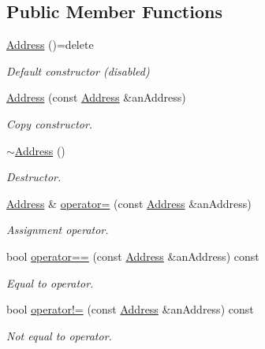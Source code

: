 \subsection*{Public Member Functions}
\begin{DoxyCompactItemize}
\item 
\hyperlink{classlibrary_1_1io_1_1ip_1_1_address_ab968d468b8bc2ba8f48fd2b6784832fe}{Address} ()=delete
\begin{DoxyCompactList}\small\item\em Default constructor (disabled) \end{DoxyCompactList}\item 
\hyperlink{classlibrary_1_1io_1_1ip_1_1_address_a222cb11723f00e1949560cd6cb6586d0}{Address} (const \hyperlink{classlibrary_1_1io_1_1ip_1_1_address}{Address} \&an\+Address)
\begin{DoxyCompactList}\small\item\em Copy constructor. \end{DoxyCompactList}\item 
\hyperlink{classlibrary_1_1io_1_1ip_1_1_address_a430e600e721374368c5bbc0a6351e094}{$\sim$\+Address} ()
\begin{DoxyCompactList}\small\item\em Destructor. \end{DoxyCompactList}\item 
\hyperlink{classlibrary_1_1io_1_1ip_1_1_address}{Address} \& \hyperlink{classlibrary_1_1io_1_1ip_1_1_address_ad399ad8624416bc52c75aa1319eeb2dc}{operator=} (const \hyperlink{classlibrary_1_1io_1_1ip_1_1_address}{Address} \&an\+Address)
\begin{DoxyCompactList}\small\item\em Assignment operator. \end{DoxyCompactList}\item 
bool \hyperlink{classlibrary_1_1io_1_1ip_1_1_address_aa471d7c4d4df06e473e5390a49b20b6e}{operator==} (const \hyperlink{classlibrary_1_1io_1_1ip_1_1_address}{Address} \&an\+Address) const
\begin{DoxyCompactList}\small\item\em Equal to operator. \end{DoxyCompactList}\item 
bool \hyperlink{classlibrary_1_1io_1_1ip_1_1_address_a56dec93d614ec71b02d57377fe687029}{operator!=} (const \hyperlink{classlibrary_1_1io_1_1ip_1_1_address}{Address} \&an\+Address) const
\begin{DoxyCompactList}\small\item\em Not equal to operator. \end{DoxyCompactList}\item 

\end{DoxyCompactItemize}
